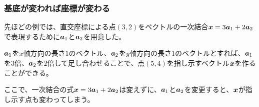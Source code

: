 \documentclass[../imaging-math]{subfiles}
\begin{document}
\subsubsection{基底が変われば座標が変わる}

先ほどの例では、直交座標による点$(3,2)$をベクトルの一次結合$\vb*{x} = 3 \vb*{a}_1 + 2 \vb*{a}_2$で表現するために$\vb*{a}_1$と$\vb*{a}_2$を用意した。

$\vb*{a}_1$を$x$軸方向の長さ$1$のベクトル、$\vb*{a}_2$を$y$軸方向の長さ$1$のベクトルとすれば、$\vb*{a}_1$を$3$倍、$\vb*{a}_2$を$2$倍して足し合わせることで、点$(5,4)$を指し示すベクトル$\vb*{x}$を作ることができる。

\br

ここで、一次結合の式$\vb*{x} = 3 \vb*{a}_1 + 2 \vb*{a}_2$は変えずに、$\vb*{a}_1$と$\vb*{a}_2$を変更すると、$\vb*{x}$が指し示す点も変わってしまう。
\end{document}
